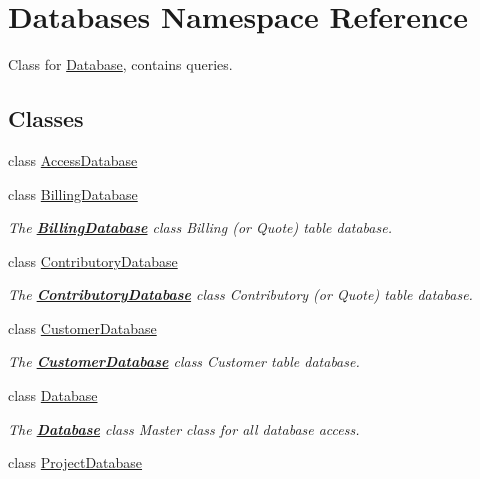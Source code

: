 \hypertarget{namespaceDatabases}{}\section{Databases Namespace Reference}
\label{namespaceDatabases}


Class for \hyperlink{classDatabases_1_1Database}{Database}, contains queries.  


\subsection*{Classes}
\begin{DoxyCompactItemize}
\item 
class \hyperlink{classDatabases_1_1AccessDatabase}{Access\+Database}
\item 
class \hyperlink{classDatabases_1_1BillingDatabase}{Billing\+Database}
\begin{DoxyCompactList}\small\item\em The {\bfseries \hyperlink{classDatabases_1_1BillingDatabase}{Billing\+Database}} class Billing (or Quote) table database. \end{DoxyCompactList}\item 
class \hyperlink{classDatabases_1_1ContributoryDatabase}{Contributory\+Database}
\begin{DoxyCompactList}\small\item\em The {\bfseries \hyperlink{classDatabases_1_1ContributoryDatabase}{Contributory\+Database}} class Contributory (or Quote) table database. \end{DoxyCompactList}\item 
class \hyperlink{classDatabases_1_1CustomerDatabase}{Customer\+Database}
\begin{DoxyCompactList}\small\item\em The {\bfseries \hyperlink{classDatabases_1_1CustomerDatabase}{Customer\+Database}} class Customer table database. \end{DoxyCompactList}\item 
class \hyperlink{classDatabases_1_1Database}{Database}
\begin{DoxyCompactList}\small\item\em The {\bfseries \hyperlink{classDatabases_1_1Database}{Database}} class Master class for all database access. \end{DoxyCompactList}\item 
class \hyperlink{classDatabases_1_1ProjectDatabase}{Project\+Database}

\end{DoxyCompactItemize}

